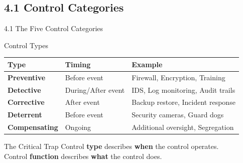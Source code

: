 \documentclass{beamer}
\begin{document}
	\subsection{4.1 Control Categories}
	\begin{frame}{4.1 The Five Control Categories}
		\begin{block}{Control Types}
			\begin{tabular}{|p{2.5cm}|p{4cm}|p{4.5cm}|}
				\hline
				\textbf{Type} & \textbf{Timing} & \textbf{Example} \\
				\hline
				\textbf{Preventive} & Before event & Firewall, Encryption, Training \\
				\hline
				\textbf{Detective} & During/After event & IDS, Log monitoring, Audit trails \\
				\hline
				\textbf{Corrective} & After event & Backup restore, Incident response \\
				\hline
				\textbf{Deterrent} & Before event & Security cameras, Guard dogs \\
				\hline
				\textbf{Compensating} & Ongoing & Additional oversight, Segregation \\
				\hline
			\end{tabular}
		\end{block}
		
		\begin{alertblock}{The Critical Trap}
			Control \textbf{type} describes \textbf{when} the control operates. \\
			Control \textbf{function} describes \textbf{what} the control does.
		\end{alertblock}
	\end{frame}
	
\end{document}

